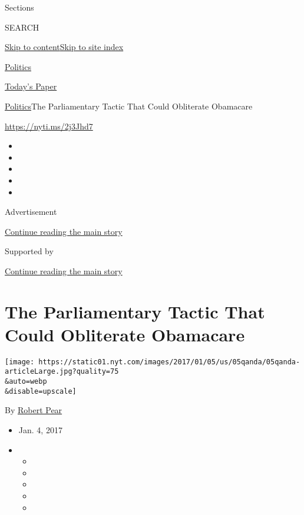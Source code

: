 Sections

SEARCH

\protect\hyperlink{site-content}{Skip to
content}\protect\hyperlink{site-index}{Skip to site index}

\href{https://www.nytimes.com/section/politics}{Politics}

\href{https://myaccount.nytimes.com/auth/login?response_type=cookie\&client_id=vi}{}

\href{https://www.nytimes.com/section/todayspaper}{Today's Paper}

\href{/section/politics}{Politics}\textbar{}The Parliamentary Tactic
That Could Obliterate Obamacare

\url{https://nyti.ms/2j3Jhd7}

\begin{itemize}
\item
\item
\item
\item
\item
\end{itemize}

Advertisement

\protect\hyperlink{after-top}{Continue reading the main story}

Supported by

\protect\hyperlink{after-sponsor}{Continue reading the main story}

\hypertarget{the-parliamentary-tactic-that-could-obliterate-obamacare}{%
\section{The Parliamentary Tactic That Could Obliterate
Obamacare}\label{the-parliamentary-tactic-that-could-obliterate-obamacare}}

\texttt{[image: https://static01.nyt.com/images/2017/01/05/us/05qanda/05qanda-articleLarge.jpg?quality=75\\\&auto=webp\\\&disable=upscale]}

By \href{https://www.nytimes.com/by/robert-pear}{Robert Pear}

\begin{itemize}
\item
  Jan. 4, 2017
\item
  \begin{itemize}
  \item
  \item
  \item
  \item
  \item
  \end{itemize}
\end{itemize}

